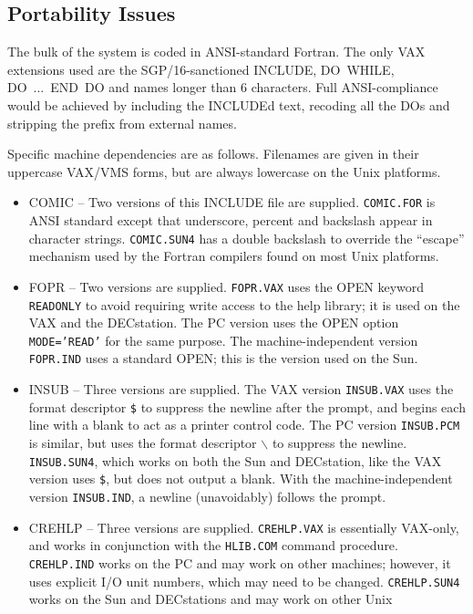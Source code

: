 \documentclass[11pt,nolof]{starlink}
\providecommand{\qt}[1]{``{\tt{#1}}''}
\providecommand{\fstring}[1]{\hbox{\hspace{0.05em}{\qt{#1}}\hspace{0.05em}}}
\begin{document}
\subsection{Portability Issues}
The bulk of the system is coded in ANSI-standard Fortran.  The only
VAX extensions used are the SGP/16-sanctioned
INCLUDE, DO~WHILE, DO~...~END~DO and names longer than
6 characters.  Full ANSI-compliance would be achieved by including
the INCLUDEd text, recoding
all the DOs and stripping the prefix \fstring{HLP\_} from
external names.

Specific machine dependencies are as follows.  Filenames are given
in their uppercase VAX/VMS forms, but are always lowercase on
the Unix platforms.
\begin{itemize}
\item COMIC -- Two versions of this INCLUDE file are supplied.
\texttt{COMIC.FOR} is ANSI standard except that underscore, percent and
backslash appear in character strings.  \texttt{COMIC.SUN4} has a double
backslash to override the ``escape'' mechanism used by the Fortran
compilers found on most Unix platforms.
\item FOPR -- Two versions are supplied.  \texttt{FOPR.VAX} uses
the OPEN keyword \texttt{READONLY} to avoid requiring
write access to the help library;  it is used on the VAX and
the DECstation.  The PC version uses the OPEN option
\texttt{MODE='READ'} for the same
purpose.  The machine-independent version \texttt{FOPR.IND} uses a
standard OPEN;  this is the version used on the Sun.
\item INSUB -- Three versions are supplied.  The VAX version
\texttt{INSUB.VAX} uses
the format descriptor \texttt{\$} to suppress the newline after the
prompt, and begins each line with a blank to act as a printer
control code.  The PC version \texttt{INSUB.PCM} is similar, but uses the
format descriptor $\backslash$ to suppress the newline.
\texttt{INSUB.SUN4}, which works on both the Sun and DECstation,
like the VAX version uses \texttt{\$}, but does not output
a blank.
With the machine-independent version \texttt{INSUB.IND}, a newline (unavoidably)
follows the prompt.
\item CREHLP -- Three versions are supplied.  \texttt{CREHLP.VAX} is essentially
VAX-only, and works in conjunction with the \texttt{HLIB.COM} command procedure.
\texttt{CREHLP.IND} works on the PC and may work on other machines;  however,
it uses explicit I/O unit numbers, which may need to be changed.
\texttt{CREHLP.SUN4} works on the Sun and DECstations and may work on other Unix

\end{itemize}
\end{document}
